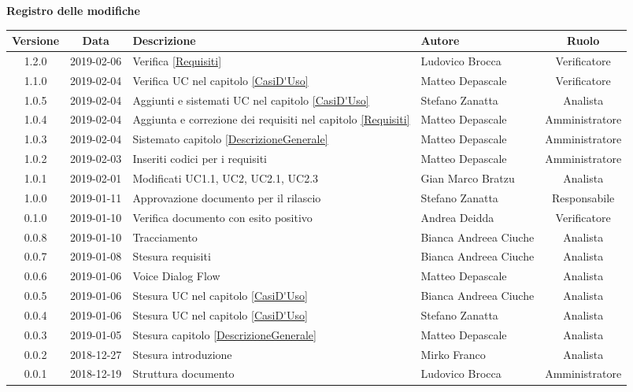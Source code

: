 	\begin{center}
		\textbf{Registro delle modifiche}
	\end{center}
	\begin{center}
		\begin{tabularx}{\textwidth}{|c|c|X|X|c|}
			\hline
			\textbf{Versione} & \textbf{Data} & \textbf{Descrizione} & \textbf{Autore} & \textbf{Ruolo} \\
			\hline
			1.2.0 & 2019-02-06 & Verifica \ref{Requisiti}& Ludovico Brocca & Verificatore \\
			\hline
			1.1.0 & 2019-02-04 & Verifica UC nel capitolo \ref{CasiD'Uso}& Matteo Depascale & Verificatore\\
			\hline
			1.0.5 & 2019-02-04 & Aggiunti e sistemati UC nel capitolo \ref{CasiD'Uso}& Stefano Zanatta & Analista\\
			\hline
			1.0.4 & 2019-02-04 & Aggiunta e correzione dei requisiti nel capitolo \ref{Requisiti}& Matteo Depascale & Amministratore\\
			\hline
			1.0.3 & 2019-02-04 & Sistemato capitolo \ref{DescrizioneGenerale}& Matteo Depascale & Amministratore\\
			\hline
			1.0.2 & 2019-02-03 & Inseriti codici per i requisiti & Matteo Depascale & Amministratore\\
			\hline
			1.0.1 & 2019-02-01 & Modificati UC1.1, UC2, UC2.1, UC2.3 & Gian Marco Bratzu & Analista\\
			\hline
			1.0.0 & 2019-01-11 & Approvazione documento per il rilascio& Stefano Zanatta & Responsabile\\
			\hline
			0.1.0 & 2019-01-10 & Verifica documento con esito positivo& Andrea Deidda & Verificatore\\
			\hline
			0.0.8 & 2019-01-10 & Tracciamento& Bianca Andreea Ciuche& Analista\\
			\hline
			0.0.7 & 2019-01-08 & Stesura requisiti & Bianca Andreea Ciuche& Analista\\
			\hline
			0.0.6 & 2019-01-06 & Voice Dialog Flow & Matteo Depascale & Analista\\
			\hline
			0.0.5 & 2019-01-06 & Stesura UC nel capitolo \ref{CasiD'Uso}& Bianca Andreea Ciuche & Analista\\
			\hline
			0.0.4 & 2019-01-06 & Stesura UC nel capitolo \ref{CasiD'Uso}& Stefano Zanatta & Analista\\
			\hline
			0.0.3 & 2019-01-05 & Stesura capitolo \ref{DescrizioneGenerale}& Matteo Depascale & Analista\\
			\hline
			0.0.2 & 2018-12-27 & Stesura introduzione & Mirko Franco & Analista\\
			\hline
			0.0.1 & 2018-12-19 & Struttura documento & Ludovico Brocca & Amministratore\\
			\hline
		\end{tabularx}
	\end{center}
\newpage